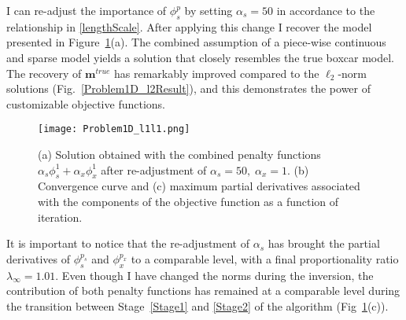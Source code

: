 I can re-adjust the importance of $\phi_s^p$ by setting $\alpha_s=50$ in accordance to the relationship in \eqref{lengthScale}.
After applying this change I recover the model presented in Figure~\ref{Problem1D_l1l1}(a). The combined assumption of a piece-wise continuous and sparse model yields a solution that closely resembles the true boxcar model. The recovery of $\mathbf{m}^{true}$ has remarkably improved compared to the $\ell_2$-norm solutions (Fig.~\ref{Problem1D_l2Result}), and this demonstrates the power of customizable objective functions.
\begin{figure}
\texttt{[image: Problem1D\_l1l1.png]}
\caption{(a) Solution obtained with the combined penalty functions $\alpha_s \phi_s^1 + \alpha_x \phi_x^1$ after re-adjustment of $\alpha_s=50,\;\alpha_x = 1$. (b) Convergence curve and (c) maximum partial derivatives associated with the components of the objective function as a function of iteration.}
\label{Problem1D_l1l1}
\end{figure}
It is important to notice that the re-adjustment of $\alpha_s$ has brought the partial derivatives of $\phi_s^{p_s}$ and $\phi_x^{p_x}$ to a comparable level, with a final proportionality ratio $\lambda_\infty=1.01$. Even though I have changed the norms during the inversion, the contribution of both penalty functions has remained at a comparable level during the transition between Stage~\ref{Stage1} and \ref{Stage2} of the algorithm (Fig~\ref{Problem1D_l1l1}(c)).

